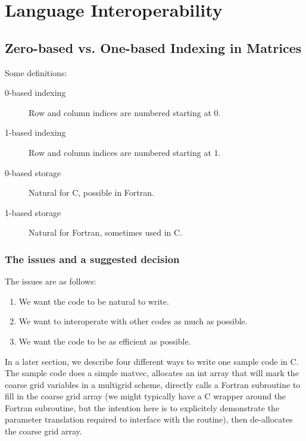 \chapter{Language Interoperability}
\label{Language Interoperability}

\section{Zero-based vs. One-based Indexing in \hypre{} Matrices}
\label{Zero-based vs. One-based Indexing in hypre Matrices}

Some definitions:
\begin{description}
\item[0-based indexing] Row and column indices are numbered starting at 0.
\item[1-based indexing] Row and column indices are numbered starting at 1.
\item[0-based storage]  Natural for C, possible in Fortran.
\item[1-based storage]  Natural for Fortran, sometimes used in C.
\end{description}

\subsection{The issues and a suggested decision}
\label{The issues and a suggested decision}

The issues are as follows:
\begin{enumerate}
  \item We want the code to be natural to write.
  \item We want to interoperate with other codes as much as possible.
  \item We want the code to be as efficient as possible.
\end{enumerate}

In a later section, we describe four different ways to write one
sample code in C.  The sample code does a simple matvec, allocates an
int array that will mark the coarse grid variables in a multigrid
scheme, directly calls a Fortran subroutine to fill in the coarse grid
array (we might typically have a C wrapper around the Fortran
subroutine, but the intention here is to explicitely demonstrate the
parameter translation required to interface with the routine), then
de-allocates the coarse grid array.

